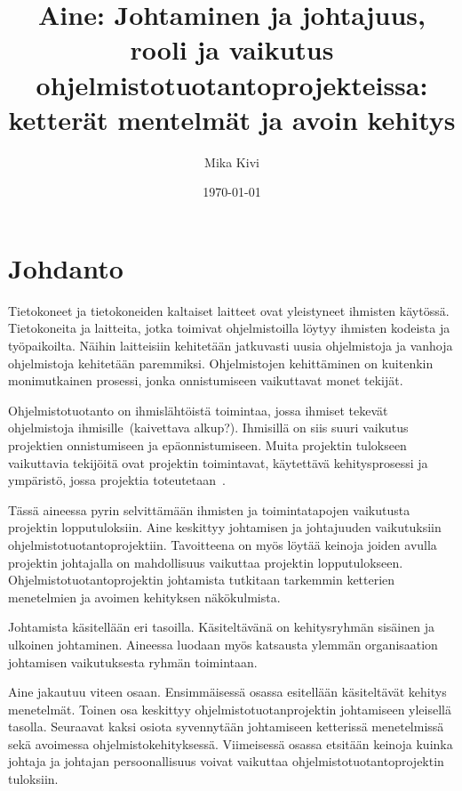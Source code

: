 \documentclass[finnish]{tktltiki2}
\title{Aine: Johtaminen ja johtajuus, rooli ja vaikutus ohjelmistotuotantoprojekteissa: ketterät mentelmät ja avoin kehitys}
\author{Mika Kivi}
\date{\today}
\theoremstyle{definition}
\theoremstyle{remark}
\begin{document}

\maketitle        %
\makeabstract     %

\tableofcontents  %
\newpage          %



\section{Johdanto}

Tietokoneet ja tietokoneiden kaltaiset laitteet ovat yleistyneet ihmisten käytössä. Tietokoneita ja laitteita, jotka toimivat ohjelmistoilla löytyy ihmisten kodeista ja työpaikoilta. Näihin laitteisiin kehitetään jatkuvasti uusia ohjelmistoja ja vanhoja ohjelmistoja kehitetään paremmiksi. Ohjelmistojen kehittäminen on kuitenkin monimutkainen prosessi, jonka onnistumiseen vaikuttavat monet tekijät.

Ohjelmistotuotanto on ihmislähtöistä toimintaa, jossa ihmiset tekevät ohjelmistoja ihmisille~\cite{Wang:2010:PPP:1810295.1810302}(kaivettava alkup?). Ihmisillä on siis suuri vaikutus projektien onnistumiseen ja epäonnistumiseen. Muita projektin tulokseen vaikuttavia tekijöitä ovat projektin toimintavat, käytettävä kehitysprosessi ja ympäristö, jossa projektia toteutetaan~\cite{McLeod:2011:FAS:1978802.1978803}. 


Tässä aineessa pyrin selvittämään ihmisten ja toimintatapojen vaikutusta projektin lopputuloksiin. Aine keskittyy johtamisen ja johtajuuden vaikutuksiin ohjelmistotuotantoprojektiin. Tavoitteena on myös löytää keinoja joiden avulla projektin johtajalla on mahdollisuus vaikuttaa projektin lopputulokseen. Ohjelmistotuotantoprojektin johtamista tutkitaan tarkemmin ketterien menetelmien ja avoimen kehityksen näkökulmista.

Johtamista käsitellään eri tasoilla. Käsiteltävänä on kehitysryhmän sisäinen ja ulkoinen johtaminen. Aineessa luodaan myös katsausta ylemmän organisaation johtamisen vaikutuksesta ryhmän toimintaan. 

Aine jakautuu viteen osaan. Ensimmäisessä osassa esitellään käsiteltävät kehitys menetelmät. Toinen osa keskittyy ohjelmistotuotanprojektin johtamiseen yleisellä tasolla. Seuraavat kaksi osiota syvennytään johtamiseen ketterissä menetelmissä sekä avoimessa ohjelmistokehityksessä. Viimeisessä osassa etsitään keinoja kuinka johtaja ja johtajan persoonallisuus voivat vaikuttaa ohjelmistotuotantoprojektin tuloksiin.
  
\end{document}
